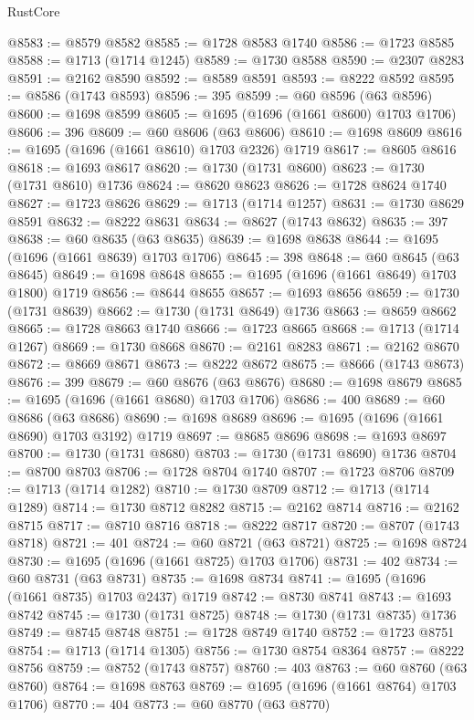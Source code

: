\begin{lexlean}{RustCore}
\begin{coremodule}
@8583 := @8579 @8582
@8585 := @1728 @8583 @1740
@8586 := @1723 @8585
@8588 := @1713 (@1714 @1245)
@8589 := @1730 @8588
@8590 := @2307 @8283
@8591 := @2162 @8590
@8592 := @8589 @8591
@8593 := @8222 @8592
@8595 := @8586 (@1743 @8593)
@8596 := 395
@8599 := @60 @8596 (@63 @8596)
@8600 := @1698 @8599
@8605 := @1695 (@1696 (@1661 @8600) @1703 @1706)
@8606 := 396
@8609 := @60 @8606 (@63 @8606)
@8610 := @1698 @8609
@8616 := @1695 (@1696 (@1661 @8610) @1703 @2326) @1719
@8617 := @8605 @8616
@8618 := @1693 @8617
@8620 := @1730 (@1731 @8600)
@8623 := @1730 (@1731 @8610) @1736
@8624 := @8620 @8623
@8626 := @1728 @8624 @1740
@8627 := @1723 @8626
@8629 := @1713 (@1714 @1257)
@8631 := @1730 @8629 @8591
@8632 := @8222 @8631
@8634 := @8627 (@1743 @8632)
@8635 := 397
@8638 := @60 @8635 (@63 @8635)
@8639 := @1698 @8638
@8644 := @1695 (@1696 (@1661 @8639) @1703 @1706)
@8645 := 398
@8648 := @60 @8645 (@63 @8645)
@8649 := @1698 @8648
@8655 := @1695 (@1696 (@1661 @8649) @1703 @1800) @1719
@8656 := @8644 @8655
@8657 := @1693 @8656
@8659 := @1730 (@1731 @8639)
@8662 := @1730 (@1731 @8649) @1736
@8663 := @8659 @8662
@8665 := @1728 @8663 @1740
@8666 := @1723 @8665
@8668 := @1713 (@1714 @1267)
@8669 := @1730 @8668
@8670 := @2161 @8283
@8671 := @2162 @8670
@8672 := @8669 @8671
@8673 := @8222 @8672
@8675 := @8666 (@1743 @8673)
@8676 := 399
@8679 := @60 @8676 (@63 @8676)
@8680 := @1698 @8679
@8685 := @1695 (@1696 (@1661 @8680) @1703 @1706)
@8686 := 400
@8689 := @60 @8686 (@63 @8686)
@8690 := @1698 @8689
@8696 := @1695 (@1696 (@1661 @8690) @1703 @3192) @1719
@8697 := @8685 @8696
@8698 := @1693 @8697
@8700 := @1730 (@1731 @8680)
@8703 := @1730 (@1731 @8690) @1736
@8704 := @8700 @8703
@8706 := @1728 @8704 @1740
@8707 := @1723 @8706
@8709 := @1713 (@1714 @1282)
@8710 := @1730 @8709
@8712 := @1713 (@1714 @1289)
@8714 := @1730 @8712 @8282
@8715 := @2162 @8714
@8716 := @2162 @8715
@8717 := @8710 @8716
@8718 := @8222 @8717
@8720 := @8707 (@1743 @8718)
@8721 := 401
@8724 := @60 @8721 (@63 @8721)
@8725 := @1698 @8724
@8730 := @1695 (@1696 (@1661 @8725) @1703 @1706)
@8731 := 402
@8734 := @60 @8731 (@63 @8731)
@8735 := @1698 @8734
@8741 := @1695 (@1696 (@1661 @8735) @1703 @2437) @1719
@8742 := @8730 @8741
@8743 := @1693 @8742
@8745 := @1730 (@1731 @8725)
@8748 := @1730 (@1731 @8735) @1736
@8749 := @8745 @8748
@8751 := @1728 @8749 @1740
@8752 := @1723 @8751
@8754 := @1713 (@1714 @1305)
@8756 := @1730 @8754 @8364
@8757 := @8222 @8756
@8759 := @8752 (@1743 @8757)
@8760 := 403
@8763 := @60 @8760 (@63 @8760)
@8764 := @1698 @8763
@8769 := @1695 (@1696 (@1661 @8764) @1703 @1706)
@8770 := 404
@8773 := @60 @8770 (@63 @8770)

\end{coremodule}
\end{lexlean}
